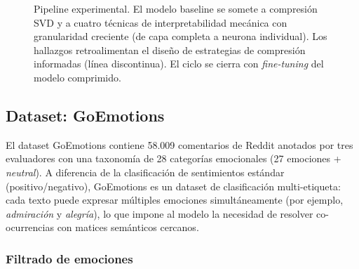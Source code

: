 \begin{figure}[H]
    \caption{Pipeline experimental. El modelo baseline se somete a compresión SVD y a
    cuatro técnicas de interpretabilidad mecánica con granularidad creciente (de capa
    completa a neurona individual). Los hallazgos retroalimentan el diseño de
    estrategias de compresión informadas (línea discontinua). El ciclo se cierra
    con \emph{fine-tuning} del modelo comprimido.}
    \label{fig:pipeline}
\end{figure}

\subsection{Dataset: GoEmotions}
\label{sec:met-dataset}

El dataset GoEmotions \cite{demszky2020goemotions} contiene 58.009 comentarios de
Reddit anotados por tres evaluadores con una taxonomía de 28 categorías emocionales
(27 emociones + \textit{neutral}). A diferencia de la clasificación de sentimientos
estándar (positivo/negativo), GoEmotions es un dataset de clasificación
multi-etiqueta: cada texto puede expresar múltiples emociones simultáneamente (por
ejemplo, \textit{admiración} y \textit{alegría}), lo que impone al modelo la necesidad
de resolver co-ocurrencias con matices semánticos cercanos.

\subsubsection{Filtrado de emociones}

